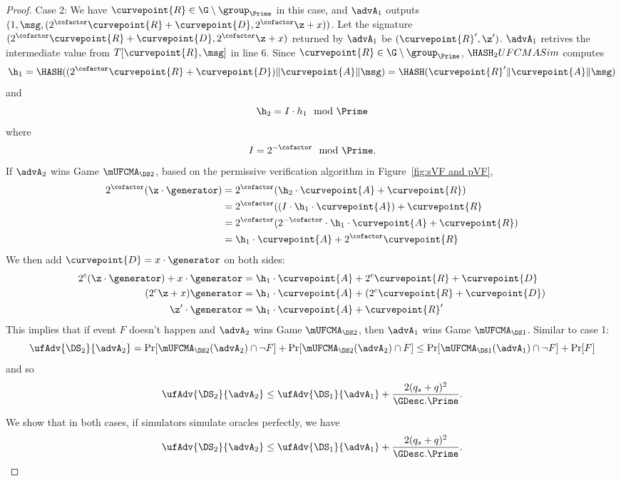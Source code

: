 \begin{proof}
	Case 2: We have $\curvepoint{R} \in \G \setminus \group_{\Prime}$ in this case, and $\advA_1$ outputs $(1, \msg, (2^\cofactor\curvepoint{R} + \curvepoint{D}, 2^\cofactor\z + x))$. Let the signature $(2^\cofactor\curvepoint{R} + \curvepoint{D}, 2^\cofactor\z + x)$ returned by $\advA_1$ be $(\curvepoint{R}', \z')$. $\advA_1$ retrives the intermediate value from $T[\curvepoint{R},  \msg]$ in line 6. Since $\curvepoint{R} \in \G \setminus \group_{\Prime}$, $\HASH_2UFCMASim$ computes 
	\[\h_1 = \HASH((2^\cofactor\curvepoint{R} + \curvepoint{D}) \|\curvepoint{A}\| \msg) = \HASH(\curvepoint{R}'\|\curvepoint{A}\| \msg)\]
	and
	\[\h_2 =  I \cdot h_1 \mod \Prime\]
	where 
	\[I = 2^{-\cofactor} \mod \Prime.\] 
	If $\advA_2$ wins Game $\mUFCMA_{\DS2}$, based on the permissive verification algorithm in Figure~\ref{fig:sVF and pVF}, 
	\begin{align*} 
		2^\cofactor(\z \cdot  \generator) &= 2^\cofactor (\h_2 \cdot \curvepoint{A} + \curvepoint{R}) \\
		&=  2^\cofactor ((I \cdot \h_1 \cdot \curvepoint{A}) + \curvepoint{R}\\
		&= 2^\cofactor (2^{-\cofactor} \cdot \h_1 \cdot \curvepoint{A} + \curvepoint{R})\\
		&=  \h_1 \cdot \curvepoint{A} + 2^\cofactor \curvepoint{R}
	\end{align*}
	We then add $\curvepoint{D} = x \cdot \generator$ on both sides:
	\begin{align*} 
		2^c(\z \cdot  \generator) +  x \cdot \generator &=  \h_1 \cdot \curvepoint{A} + 2^c \curvepoint{R} + \curvepoint{D}\\
		(2^c \z + x)\generator &=  \h_1 \cdot \curvepoint{A} + (2^c \curvepoint{R} + \curvepoint{D})\\
		\z' \cdot  \generator &= \h_1 \cdot \curvepoint{A} + \curvepoint{R}'
	\end{align*}
	This implies that if event $F$ doesn't happen and $\advA_2$ wins Game $\mUFCMA_{\DS2}$, then $\advA_1$ wins Game $\mUFCMA_{\DS1}$. Similar to case 1:
	\[\ufAdv{\DS_2}{\advA_2} = \Pr[\mUFCMA_{\DS2}(\advA_2) \cap \neg F] +  \Pr[\mUFCMA_{\DS2}(\advA_2) \cap F] \leq \Pr[\mUFCMA_{\DS1}(\advA_1) \cap \neg F] + \Pr[F]\] 
	and so
	\[\ufAdv{\DS_2}{\advA_2} \leq \ufAdv{\DS_1}{\advA_1} +  \frac{2(q_s + q)^2}{\GDesc.\Prime}.\]
	
	We show that in both cases, if simulators simulate oracles perfectly, we have
\[\ufAdv{\DS_2}{\advA_2} \leq \ufAdv{\DS_1}{\advA_1} +  \frac{2(q_s + q)^2}{\GDesc.\Prime}.\]


\end{proof}

